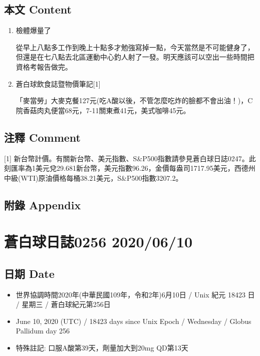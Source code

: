 \documentclass[a5paper, 11pt
]{book}
\providecommand{\tightlist}{%
  \setlength{\itemsep}{0pt}\setlength{\parskip}{0pt}}
\begin{document}
\hypertarget{ux672cux6587-content-8}{%
\subsection{本文 Content}\label{ux672cux6587-content-8}}

\begin{enumerate}
\def\labelenumi{\arabic{enumi}.}
\item
  檢體爆量了

  從早上八點多工作到晚上十點多才勉強寫掉一點，今天當然是不可能健身了，但還是在七八點去北區運動中心釣人射了一發。明天應該可以空出一些時間把資格考報告做完。
\item
  蒼白球飲食誌暨物價筆記{[}1{]}

  「麥當勞」大麥克餐127元(吃A酸以後，不管怎麼吃炸的臉都不會出油！)，C院香菇肉丸便當68元，7-11關東煮41元，美式咖啡45元。
\end{enumerate}

\hypertarget{ux6ce8ux91cb-comment-8}{%
\subsection{注釋 Comment}\label{ux6ce8ux91cb-comment-8}}

{[}1{]}
新台幣計價。有關新台幣、美元指數、S\&P500指數請參見蒼白球日誌0247。此刻匯率為1美元兌29.681新台幣，美元指數96.26，金價每盎司1717.95美元，西德州中級(WTI)原油價格每桶38.21美元，S\&P500指數3207.2。

\hypertarget{ux9644ux9304-appendix-8}{%
\subsection{附錄 Appendix}\label{ux9644ux9304-appendix-8}}

\hypertarget{ux84bcux767dux7403ux65e5ux8a8c0256-20200610}{%
\section{蒼白球日誌0256
2020/06/10}\label{ux84bcux767dux7403ux65e5ux8a8c0256-20200610}}

\hypertarget{ux65e5ux671f-date-9}{%
\subsection{日期 Date}\label{ux65e5ux671f-date-9}}

\begin{itemize}
\tightlist
\item
  世界協調時間2020年(中華民國109年，令和2年)6月10日 / Unix 紀元 18423 日
  / 星期三 / 蒼白球紀元第256日
\item
  June 10, 2020 (UTC) / 18423 days since Unix Epoch / Wednesday / Globus
  Pallidum day 256
\item
  特殊註記: 口服A酸第39天，劑量加大到20mg QD第13天
\end{itemize}
\end{document}
